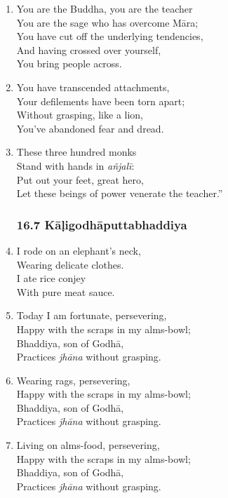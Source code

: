 \documentclass[10pt, openany]{book}
\begin{document}
\begin{enumerate}
\item You are the Buddha, you are the teacher\\
You are the sage who has overcome Māra;\\
You have cut off the underlying tendencies,\\
And having crossed over yourself, \\
You bring people across.

\item You have transcended attachments,\\
Your defilements have been torn apart;\\
Without grasping, like a lion,\\
You’ve abandoned fear and dread.

\item These three hundred monks\\
Stand with hands in \emph{añjalī}:\\
Put out your feet, great hero,\\
Let these beings of power venerate the teacher.”

\subsubsection*{16.7 Kāḷigodhāputtabhaddiya}

\item I rode on an elephant’s neck,\\
Wearing delicate clothes.\\
I ate rice conjey\\
With pure meat sauce.

\item Today I am fortunate, persevering,\\
Happy with the scraps in my alms-bowl;\\
Bhaddiya, son of Godhā,\\
Practices \emph{jhāna} without grasping.

\item Wearing rags, persevering,\\
Happy with the scraps in my alms-bowl;\\
Bhaddiya, son of Godhā,\\
Practices \emph{jhāna} without grasping.

\item Living on alms-food, persevering,\\
Happy with the scraps in my alms-bowl;\\
Bhaddiya, son of Godhā,\\
Practices \emph{jhāna} without grasping.


\end{enumerate}
\end{document}
